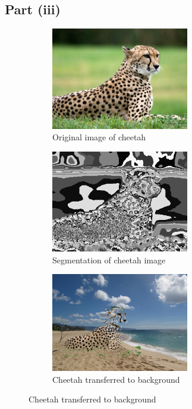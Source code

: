 \documentclass{math}
\begin{document}
\subsection*{Part (iii)}
\begin{figure}[H]
  \begin{subfigure}{0.33\linewidth}
    \centering
    \includegraphics[width=6cm]{assets/hw_02_cheetah.jpg}
    \caption{Original image of cheetah}
  \end{subfigure}
  \begin{subfigure}{0.33\linewidth}
    \centering
    \includegraphics[width=6cm]{assets/hw_02_cheetah_segmentation.png}
    \caption{Segmentation of cheetah image}
  \end{subfigure}
  \begin{subfigure}{0.33\linewidth}
    \centering
    \includegraphics[width=6cm]{assets/hw_02_cheetah_transposed.png}
    \caption{Cheetah transferred to background}
  \end{subfigure}
\end{figure}
\end{document}
